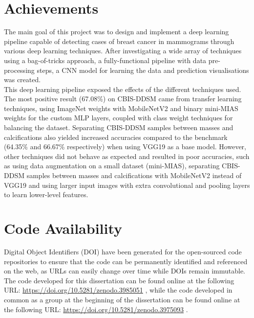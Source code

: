 \section{Achievements}

The main goal of this project was to design and implement a deep learning pipeline capable of detecting cases of breast cancer in mammograms through various deep learning techniques. After investigating a wide array of techniques using a bag-of-tricks approach, a fully-functional pipeline with data pre-processing steps, a CNN model for learning the data and prediction visualisations was created.\\

This deep learning pipeline exposed the effects of the different techniques used. The most positive result (67.08\%) on CBIS-DDSM came from transfer learning techniques, using ImageNet weights with MobileNetV2 and binary mini-MIAS weights for the custom MLP layers, coupled with class weight techniques for balancing the dataset. Separating CBIS-DDSM samples between masses and calcifications also yielded increased accuracies compared to the benchmark (64.35\% and 66.67\% respectively) when using VGG19 as a base model. However, other techniques did not behave as expected and resulted in poor accuracies, such as using data augmentation on a small dataset (mini-MIAS), separating CBIS-DDSM samples between masses and calcifications with MobileNetV2 instead of VGG19 and using larger input images with extra convolutional and pooling layers to learn lower-level features.


\section{Code Availability}

Digital Object Identifiers (DOI) have been generated for the open-sourced code repositories to ensure that the code can be permanently identified and referenced on the web, as URLs can easily change over time while DOIs remain immutable.\\

The code developed for this dissertation can be found online at the following URL: \url{https://doi.org/10.5281/zenodo.3985051} \citep{adam_jaamour_2020_src}, while the code developed in common as a group at the beginning of the dissertation can be found online at the following URL: \url{https://doi.org/10.5281/zenodo.3975093} \citep{adam_jaamour_2020_3975093}.

